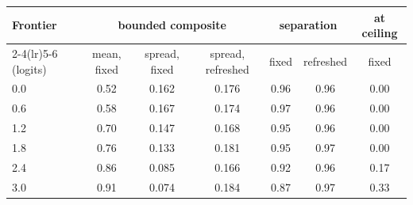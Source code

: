 \begin{tabular}{@{}lcccccc@{}}\toprule Frontier & \multicolumn{3}{c}{bounded composite} & \multicolumn{2}{c}{separation} & at ceiling \\ \cmidrule(lr){2-4}\cmidrule(lr){5-6}
(logits) & mean, fixed & spread, fixed & spread, refreshed & fixed & refreshed & fixed \\ \midrule
0.0 & 0.52 & 0.162 & 0.176 & 0.96 & 0.96 & 0.00 \\
0.6 & 0.58 & 0.167 & 0.174 & 0.97 & 0.96 & 0.00 \\
1.2 & 0.70 & 0.147 & 0.168 & 0.95 & 0.96 & 0.00 \\
1.8 & 0.76 & 0.133 & 0.181 & 0.95 & 0.97 & 0.00 \\
2.4 & 0.86 & 0.085 & 0.166 & 0.92 & 0.96 & 0.17 \\
3.0 & 0.91 & 0.074 & 0.184 & 0.87 & 0.97 & 0.33 \\
\bottomrule\end{tabular}